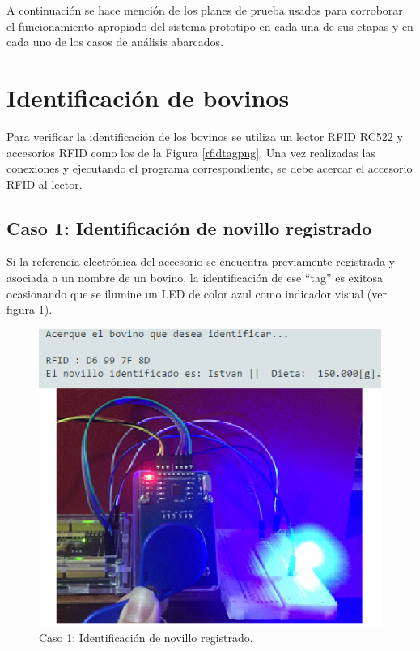 A continuación se hace mención de los planes de prueba usados para corroborar el funcionamiento apropiado del sistema prototipo en cada una de sus etapas y en cada uno de los casos de análisis abarcados.

\section{Identificación de bovinos}
Para verificar la identificación de los bovinos se utiliza un lector RFID RC522  y accesorios RFID como los de la Figura \ref{rfidtagpng}. Una vez realizadas las conexiones y ejecutando el programa correspondiente, se debe acercar el accesorio RFID al lector.

\subsection{Caso 1: Identificación de novillo registrado}

 Si la referencia electrónica del accesorio se encuentra previamente registrada y asociada a un nombre de un bovino, la identificación de ese ``tag'' es exitosa  ocasionando que se ilumine un LED de color azul como indicador visual (ver figura \ref{idokpng}). 
 \begin{figure}[H]
    \centering
    \includegraphics[scale=0.8]{img/idok.png}
    \caption{Caso 1: Identificación de novillo registrado.}
    \label{idokpng}
 \end{figure}
 
